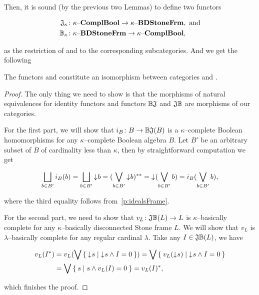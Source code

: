 Then, it is sound (by the previous two Lemmas) to define two functors

\begin{align*}
    \DEFSYM{JK}{\JK}&\colon \kComplBool \to \kBDStoneFrm, \text{ and} \\
    \DEFSYM{BcK}{\BcK}&\colon \kBDStoneFrm \to \kComplBool,
\end{align*}

\noindent as the restriction of \JO{} and \BcO{} to the corresponding subcategories. And we get the following

\begin{theorem*}\label{p:kappaDuality}
    The functors \JK{} and \BcK{} constitute an isomorphism between categories \kComplBool{} and \kBDStoneFrm.
\end{theorem*}
\begin{proof}
    The only thing we need to show is that the morphisms of natural equivalences for identity functors and functors $\mathbb{B}\mathfrak{J}$ and $\mathfrak{J}\mathbb{B}$ are morphisms of our categories.

    For the first part, we will show that $i_B\colon B \to \mathbb{B}\mathfrak{J}(B)$ is a $\kappa$--complete Boolean homomorphisms for any $\kappa$--complete Boolean algebra $B$. Let $B'$ be an arbitrary subset of $B$ of cardinality less than $\kappa$, then by straightforward computation we get

    $$
        \bigsqcup_{b\in B'} i_B(b) = \bigsqcup_{b\in B'} \mathord{\downarrow}\mkern1mu b = (\bigvee_{b\in B'} \mathord{\downarrow}\mkern1mu b)^{**} = \mathord{\downarrow}\mkern1mu (\bigvee_{b\in B'} b) = i_B(\bigvee_{b\in B'} b),
    $$

    \noindent where the third equality follows from~\ref{p:idealsFrame}.

    For the second part, we need to show that $v_L\colon \mathfrak{J}\mathbb{B}(L) \to L$ is $\kappa$--basically complete for any $\kappa$--basically disconnected Stone frame $L$. We will show that $v_L$ is $\lambda$--basically complete for any regular cardinal $\lambda$. Take any $I \in \mathfrak{J}\mathbb{B}(L)$, we have

    \begin{align*}
        v_L(I^*) &= v_L(\bigvee \Set{ \mathord{\downarrow}\mkern1mus | \mathord{\downarrow}\mkern1mus \wedge I = 0 })
                  = \bigvee \Set{ v_L(\mathord{\downarrow}\mkern1mus) | \mathord{\downarrow}\mkern1mus \wedge I = 0 } \\
                 &= \bigvee \Set{ s | s \wedge v_L(I) = 0 } = v_L(I)^*,
    \end{align*}

    \noindent which finishes the proof.
\end{proof}

